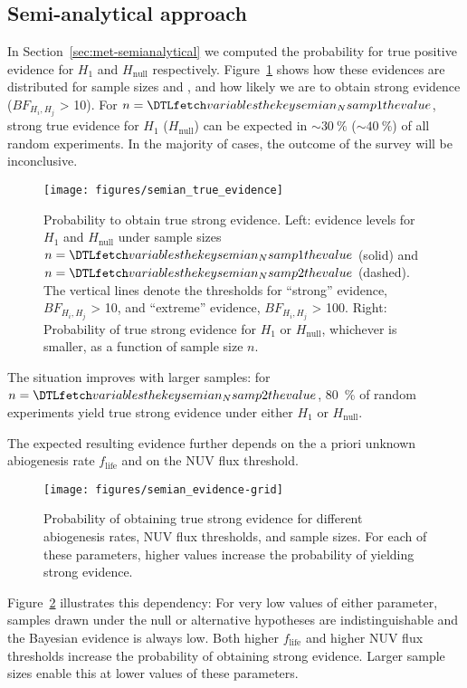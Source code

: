 \documentclass[modern,linenumbers]{aastex631}
\begin{document}
\subsection{Semi-analytical approach}\label{sec:results-semianalytical}
In Section~\ref{sec:met-semianalytical} we computed the probability for true positive evidence for $H_\mathrm{1}$ and $H_\mathrm{null}$ respectively.
Figure~\ref{fig:semian_true_evidence} shows how these evidences are distributed for sample sizes  and , and how likely we are to obtain strong evidence ($BF_{H_i, H_j}$ > 10).
For $n = \var{semian_Nsamp1}$, strong true evidence for $H_\mathrm{1}$ ($H_\mathrm{null}$) can be expected in $\sim \SI{30}{\percent}$ ($\sim \SI{40}{\percent}$) of all random experiments.
In the majority of cases, the outcome of the survey will be inconclusive.
\begin{figure*}
    \begin{centering}
        \texttt{[image: figures/semian\_true\_evidence]}
        \caption{Probability to obtain true strong evidence. Left: evidence levels for $H_\mathrm{1}$ and $H_\mathrm{null}$ under sample sizes $n = \var{semian_Nsamp1}$ (solid) and $n = \var{semian_Nsamp2}$ (dashed). The vertical lines denote the thresholds for ``strong'' evidence, $BF_{H_i, H_j}$ > 10, and ``extreme'' evidence, $BF_{H_i, H_j}$ > 100. Right: Probability of true strong evidence for $H_\mathrm{1}$ or $H_\mathrm{null}$, whichever is smaller, as a function of sample size $n$.}
        \label{fig:semian_true_evidence}
    \end{centering}
\end{figure*}
The situation improves with larger samples: for $n = \var{semian_Nsamp2}$, \SI{80}{\percent} of random experiments yield true strong evidence under either $H_\mathrm{1}$ or $H_\mathrm{null}$.

The expected resulting evidence further depends on the a priori unknown abiogenesis rate $f_\mathrm{life}$ and on the \gls{NUV} flux threshold.
\begin{figure*}
    \begin{centering}
        \texttt{[image: figures/semian\_evidence-grid]}
        \caption{Probability of obtaining true strong evidence for different abiogenesis rates, \gls{NUV} flux thresholds, and sample sizes. For each of these parameters, higher values increase the probability of yielding strong evidence.}
        \label{fig:semian_evidence-grid}
    \end{centering}
\end{figure*}
Figure~\ref{fig:semian_evidence-grid} illustrates this dependency: For very low values of either parameter, samples drawn under the null or alternative hypotheses are indistinguishable and the Bayesian evidence is always low.
Both higher $f_\mathrm{life}$ and higher \gls{NUV} flux thresholds increase the probability of obtaining strong evidence.
Larger sample sizes enable this at lower values of these parameters.
\end{document}
